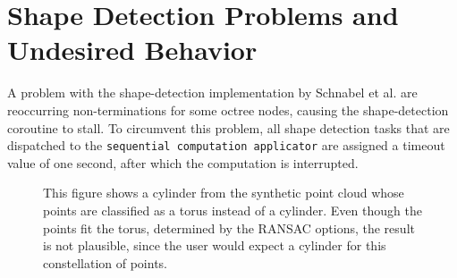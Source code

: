 \section{Shape Detection Problems and Undesired Behavior}
\label{sec:shape_detection_problems}

A problem with the shape-detection implementation by Schnabel et al. \cite{schnabel-2007-software} are reoccurring non-terminations for some octree nodes, causing the shape-detection coroutine to stall. To circumvent this problem, all shape detection tasks that are dispatched to the \verb|sequential computation applicator| are assigned a timeout value of one second, after which the computation is interrupted. 

\begin{figure}
\centering
{}%
{}      
\caption[Implausible torus is detected instead of a more plausible cylinder. ]
{This figure shows a cylinder from the synthetic point cloud whose points are classified as a torus instead of a cylinder. Even though the points fit the torus, determined by the RANSAC options, the result is not plausible, since the user would expect a cylinder for this constellation of points. }
\label{fig:missfittedTorus}
\end{figure}

